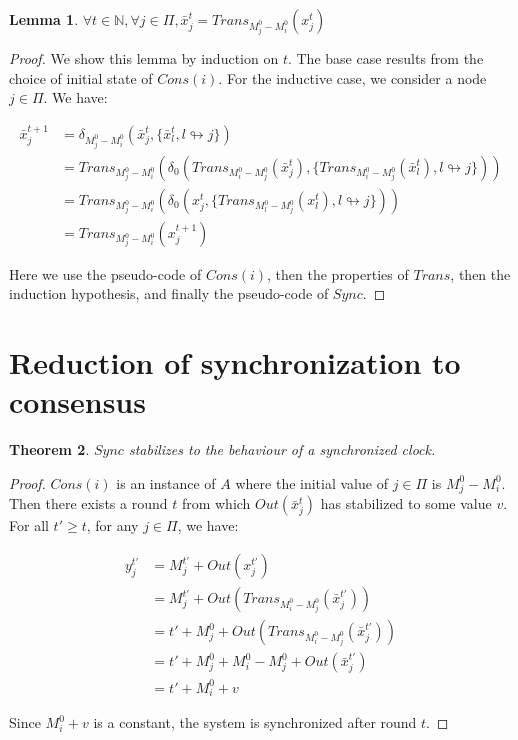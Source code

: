 \documentclass[11pt,letterpaper]{article}
\newtheorem{thm}{Theorem}
\newtheorem{lem}[thm]{Lemma}
\begin{document}
\begin{lem}
	$\forall t \in \mathds{N}, \forall j \in \Pi, \bar{x}^t_j = Trans_{M_j^0 - M_i^0}(x_j^t)$
\end{lem}
\begin{proof}
	We show this lemma by induction on $t$.
	The base case results from the choice of initial state of $Cons(i)$.
	For the inductive case, we consider a node $j \in \Pi$.
	We have: 

	\begin{align*}
		\bar x_j^{t+1} &= \delta_{M^0_j-M^0_i}(\bar x_j^t, \{\bar x_l^t, l \looparrowright j\}) \\
		&= Trans_{M^0_j-M^0_i}(\delta_0(Trans_{M^0_i-M^0_j}(\bar x_j^t), \{Trans_{M^0_i-M^0_j}(\bar x_l^t), l \looparrowright j\})) \\
		&= Trans_{M^0_j-M^0_i}(\delta_0(x_j^t, \{Trans_{M^0_l-M^0_j}(x_l^t), l \looparrowright j\})) \\
		&= Trans_{M^0_j-M^0_i}(x_j^{t+1})
	\end{align*}

	\noindent Here we use the pseudo-code of $Cons(i)$, then the properties of $Trans$, then the induction hypothesis, and finally the pseudo-code of $Sync$.
\end{proof}

\section{Reduction of synchronization to consensus}

\begin{thm}
	$Sync$ stabilizes to the behaviour of a synchronized clock.
\end{thm}
\begin{proof}
	$Cons(i)$ is an instance of $A$ where the initial value of $j \in \Pi$ is $M_j^0-M_i^0$.
	Then there exists a round $t$ from which $Out(\bar x^t_j)$ has stabilized to some value $v$.
	For all $t' \geq t$, for any $j \in \Pi$, we have:

	\begin{align*}
		y_j^{t'} &= M_j^{t'} + Out(x_j^{t'}) \\
		&= M_j^{t'} + Out(Trans_{M_i^0-M_j^0}(\bar x_j^{t'})) \\
		&= t' + M_j^0 + Out(Trans_{M_i^0-M_j^0}(\bar x_j^{t'}))  \\
		&= t' + M_j^0 + M_i^0-M_j^0 + Out(\bar x_j^{t'}) \\
		&= t' + M_i^0 + v
	\end{align*}

	\noindent Since $M_i^0+v$ is a constant, the system is synchronized after round $t$.
\end{proof}
\end{document}

